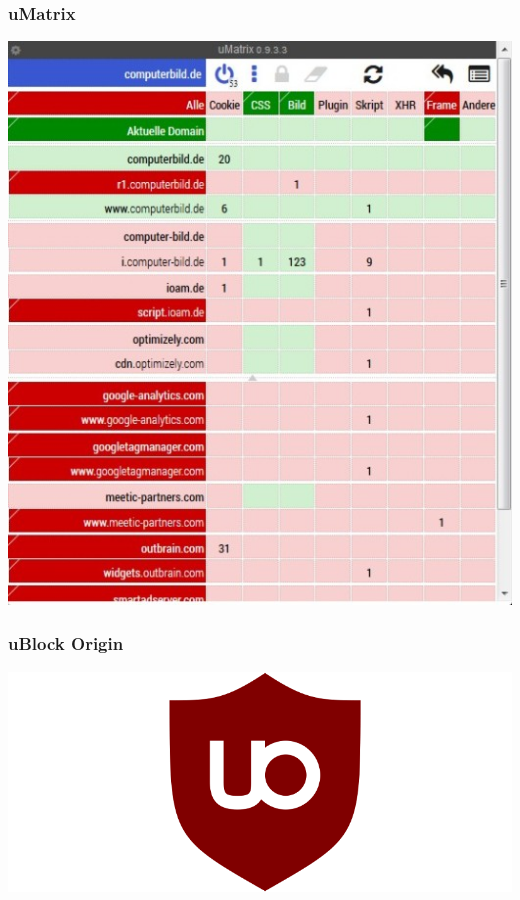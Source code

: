 \documentclass[12pt, table]{beamer}
\begin{document}
\begin{frame}
    \frametitle{uMatrix}
    \begin{center}
    	\includegraphics[height=0.7\textheight]{../img/umatrix.jpg}
    \end{center}
\end{frame}

\begin{frame}
    \frametitle{uBlock Origin}
    \begin{center}
    	\includegraphics[height=0.7\textheight]{../img/ublock-edge-extension.png} 
	\end{center}       
\end{frame}
\end{document}
